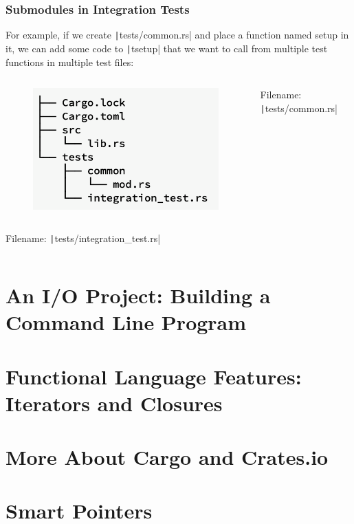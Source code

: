 \documentclass{beamer}
\begin{document}
\begin{frame}[fragile]
	\frametitle{Submodules in Integration Tests}
	For example, if we create \texttt|tests/common.rs| and place a function named setup in it, we can add some code to \texttt|tsetup| that we want to call from multiple test functions in multiple test files:
	
	
	\begin{columns}
		\begin{figure}
			\centering
			\includegraphics[width=0.8\linewidth]{img/test2.png}
		\end{figure}
		\scriptsize
			Filename: \texttt|tests/common.rs|
		\inputminted[fontsize=\scriptsize]{rust}{./code/test10.rs}
	\end{columns}
\scriptsize
Filename: \texttt|tests/integration_test.rs|

\inputminted[fontsize=\scriptsize]{rust}{./code/test11.rs}

\end{frame}

\section{An I/O Project: Building a Command Line Program}
\section{Functional Language Features: Iterators and Closures}
\section{More About Cargo and Crates.io}
\section{Smart Pointers}
\end{document}
